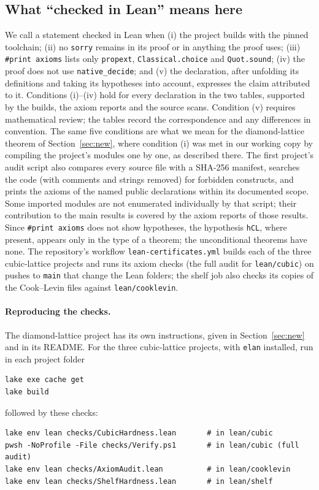 \documentclass[11pt,letterpaper]{article}
\theoremstyle{definition}
\theoremstyle{remark}
\newcommand{\lean}[1]{\texttt{#1}}
\begin{document}
\subsection{What ``checked in Lean'' means here}
We call a statement checked in Lean when (i) the project builds with the pinned toolchain; (ii) no
\lean{sorry} remains in its proof or in anything the proof uses; (iii) \lean{\#print axioms} lists only
\lean{propext}, \lean{Classical.choice} and \lean{Quot.sound}; (iv) the proof does not use
\lean{native\_decide}; and (v) the declaration, after unfolding its definitions and taking its
hypotheses into account, expresses the claim attributed to it. Conditions (i)--(iv) hold for every
declaration in the two tables, supported by the builds, the axiom reports and the source scans.
Condition (v) requires mathematical review; the tables record the correspondence and any
differences in convention. The same five conditions are what we mean for the diamond-lattice
theorem of Section~\ref{sec:new}, where condition (i) was met in our working copy by compiling the
project's modules one by one, as described there. The
first project's audit script also compares every source file with a SHA-256 manifest, searches the
code (with comments and strings removed) for forbidden constructs, and prints the axioms of the
named public declarations within its documented scope. Some imported modules are not enumerated
individually by that script; their contribution to the main results is covered by the axiom reports
of those results. Since \lean{\#print axioms} does not show hypotheses, the hypothesis \lean{hCL},
where present, appears only in the type of a theorem; the unconditional theorems have none. The
repository's workflow \lean{lean-certificates.yml} builds each of the three cubic-lattice projects and runs its
axiom checks (the full audit for \lean{lean/cubic}) on pushes to \lean{main} that change the Lean
folders; the shelf job also checks its copies of the Cook--Levin files against \lean{lean/cooklevin}.

\paragraph{Reproducing the checks.}
The diamond-lattice project has its own instructions, given in Section~\ref{sec:new} and in its
README. For the three cubic-lattice projects, with \lean{elan} installed, run in each project folder
{\small
\begin{verbatim}
lake exe cache get
lake build
\end{verbatim}
}
\noindent followed by these checks:
{\small
\begin{verbatim}
lake env lean checks/CubicHardness.lean       # in lean/cubic
pwsh -NoProfile -File checks/Verify.ps1       # in lean/cubic (full audit)
lake env lean checks/AxiomAudit.lean          # in lean/cooklevin
lake env lean checks/ShelfHardness.lean       # in lean/shelf
\end{verbatim}
}
\end{document}
